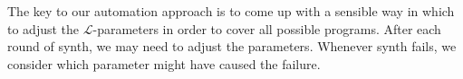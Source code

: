 
The key to our automation approach is to come up with a sensible way in which to
adjust the $\mathcal{L}$-parameters in order to cover all possible programs.
After each round of {\sc synth}, we may need to adjust the parameters.  
Whenever {\sc synth} fails, we consider which parameter might have caused the
failure.  






